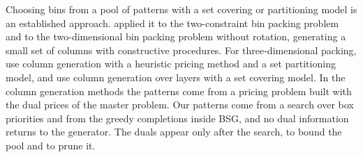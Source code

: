 Choosing bins from a pool of patterns with a set covering or partitioning model is an established
approach. \citet{Monaci2006} applied it to the two-constraint bin packing problem and to the
two-dimensional bin packing problem without rotation, generating a small set of columns with
constructive procedures. For three-dimensional packing, \citet{Mahvash2018} use column generation
with a heuristic pricing method and a set partitioning model, and \citet{Elhedhli2019} use column
generation over layers with a set covering model. In the column generation methods the patterns
come from a pricing problem built with the dual prices of the master problem. Our patterns come
from a search over box priorities and from the greedy completions inside BSG, and no dual
information returns to the generator. The duals appear only after the search, to bound the pool
and to prune it.
